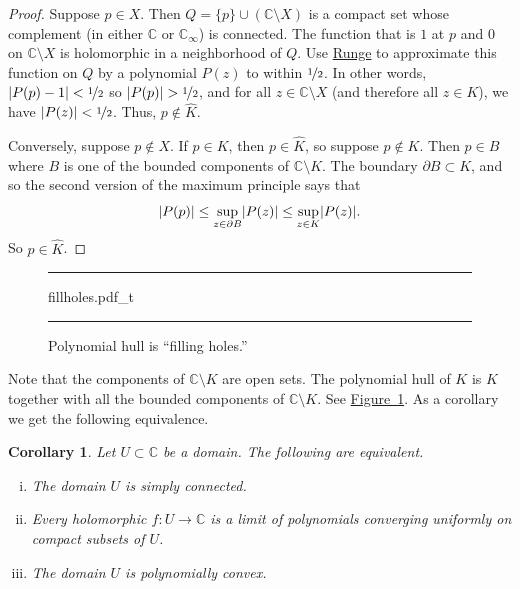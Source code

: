 \documentclass[12pt,openany]{book}
\newcommand{\avoidbreak}{\postdisplaypenalty=100}
\newcommand{\sabs}[1]{\lvert {#1} \rvert}
\newcommand{\abs}[1]{\left\lvert {#1} \right\rvert}
\newcommand{\C}{{\mathbb{C}}}
\newcommand{\myquote}[1]{``#1''}
\theoremstyle{plain}
\newtheorem{cor}[thm]{Corollary}
\theoremstyle{remark}
\theoremstyle{definition}
\newenvironment{myfig}{%
\begin{figure}[h!t]
\noindent\rule{\textwidth}{0.5pt}\vspace{12pt}\par\centering}%
{\par\noindent\rule{\textwidth}{0.5pt}
\end{figure}}
\theoremstyle{exercise}
\theoremstyle{example}
\newcommand{\figureref}[1]{\hyperref[#1]{Figure~\ref*{#1}}}
\begin{document}
\begin{proof}
Suppose $p \in X$.  Then $Q=\{ p \} \cup ( \C \setminus X )$ is a compact set
whose
complement (in either $\C$ or $\C_\infty$) is connected.
The function that is $1$ at $p$ and $0$ on $\C \setminus X$ is
holomorphic in a neighborhood of $Q$.
Use \hyperref[thm:rungecpt]{Runge} to approximate this function on $Q$
by a polynomial $P(z)$ to within $\nicefrac{1}{2}$.  In other words,
$\abs{P(p)-1} < \nicefrac{1}{2}$ so 
$\abs{P(p)} > \nicefrac{1}{2}$, and for all $z \in \C \setminus X$ (and
therefore all $z \in K$),
we have 
$\abs{P(z)} < \nicefrac{1}{2}$.  Thus, $p \notin \widehat{K}$.

Conversely, suppose $p \notin X$.
If $p \in K$, then $p \in \widehat{K}$, so suppose $p \notin K$.
Then $p \in B$ where $B$
is one of the bounded components of $\C \setminus K$.  The boundary
$\partial B \subset K$, and so the second version of the maximum
principle says that 
\begin{equation*}
\sabs{P(p)} \leq
\sup_{z \in \partial B} \sabs{P(z)}
\leq
\sup_{z \in K} \sabs{P(z)}.
\avoidbreak
\end{equation*}
So $p \in \widehat{K}$.
\end{proof}

\begin{myfig}
{fillholes.pdf_t}
\caption{Polynomial hull is \myquote{filling holes.}\label{fig:fillholes}}
\end{myfig}

Note that the components of $\C \setminus K$ are open sets.
The polynomial hull of $K$ is $K$ together with all the bounded components
of $\C \setminus K$.  See \figureref{fig:fillholes}.
As a corollary we get the following equivalence.

\begin{cor}
Let $U \subset \C$ be a domain.  The following are equivalent.
\begin{enumerate}[(i)]
\item\label{cor:polyhull:i}
The domain $U$ is simply connected.
\item\label{cor:polyhull:ii}
Every holomorphic $f \colon U \to \C$ is a limit of polynomials
converging uniformly on compact subsets of $U$.
\item\label{cor:polyhull:iii}
The domain $U$ is polynomially convex.
\end{enumerate}
\end{cor}
\end{document}
